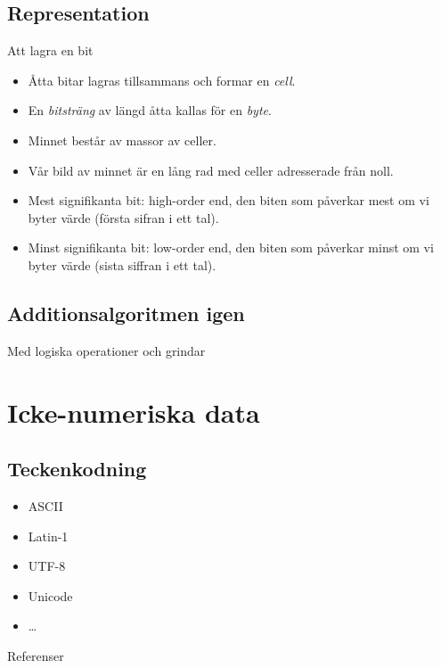 \documentclass{beamer}
\theoremstyle{definition}
\theoremstyle{remark}
\begin{document}
\subsection{Representation}

\begin{frame}{\insertsubsectionhead}{Att lagra en bit}
\end{frame}

\begin{frame}{\insertsubsectionhead}
  \begin{itemize}
    \item Åtta bitar lagras tillsammans och formar en \emph{cell}.
    \item En \emph{bitsträng} av längd åtta kallas för en \emph{byte}.
    \item Minnet består av massor av celler.
    \item Vår bild av minnet är en lång rad med celler adresserade från noll.
    \item Mest signifikanta bit: high-order end, den biten som påverkar mest om 
      vi byter värde (första sifran i ett tal).
    \item Minst signifikanta bit: low-order end, den biten som påverkar minst 
      om vi byter värde (sista siffran i ett tal).
  \end{itemize}
\end{frame}

\subsection{Additionsalgoritmen igen}

\begin{frame}{\insertsubsectionhead}{Med logiska operationer och grindar}
\end{frame}


\section{Icke-numeriska data}

\subsection{Teckenkodning}

\begin{frame}{\insertsubsectionhead}
  \begin{itemize}
    \item ASCII
    \item Latin-1
    \item UTF-8
    \item Unicode
    \item \dots
  \end{itemize}
\end{frame}



\begin{frame}{Referenser}
  
\end{frame}
\end{document}
